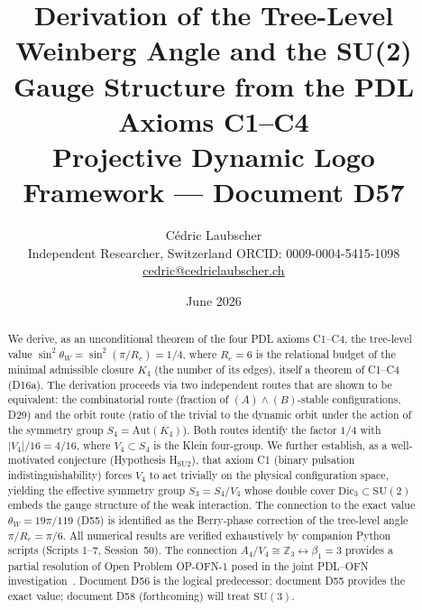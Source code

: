\documentclass[11pt,a4paper]{article}
\newcommand{\Kfour}{K_4}
\newcommand{\Retot}{R_e}
\newcommand{\sinW}{\sin^2\!\theta_W}
\newcommand{\thetaW}{\theta_W}
\begin{document}

\title{\textbf{Derivation of the Tree-Level Weinberg Angle and the SU(2) Gauge Structure from the PDL Axioms C1--C4}\\[0.5em]
\large Projective Dynamic Logo Framework --- Document D57}

\author{C\'edric Laubscher\\
\small Independent Researcher, Switzerland \quad ORCID: 0009-0004-5415-1098\\
\small \href{mailto:cedric@cedriclaubscher.ch}{cedric@cedriclaubscher.ch}}

\date{June 2026}

\maketitle

\begin{abstract}
We derive, as an unconditional theorem of the four PDL axioms C1--C4, the tree-level value $\sinW = \sin^2(\pi/\Retot) = 1/4$, where $\Retot = 6$ is the relational budget of the minimal admissible closure $\Kfour$ (the number of its edges), itself a theorem of C1--C4 (D16a). The derivation proceeds via two independent routes that are shown to be equivalent: the combinatorial route (fraction of $(A)\wedge(B)$-stable configurations, D29) and the orbit route (ratio of the trivial to the dynamic orbit under the action of the symmetry group $S_4 = \mathrm{Aut}(\Kfour)$). Both routes identify the factor $1/4$ with $|V_4|/16 = 4/16$, where $V_4 \subset S_4$ is the Klein four-group. We further establish, as a well-motivated conjecture (Hypothesis H$_{\mathrm{SU2}}$), that axiom C1 (binary pulsation indistinguishability) forces $V_4$ to act trivially on the physical configuration space, yielding the effective symmetry group $S_3 = S_4/V_4$ whose double cover $\mathrm{Dic}_3 \subset \mathrm{SU}(2)$ embeds the gauge structure of the weak interaction. The connection to the exact value $\thetaW = 19\pi/119$ (D55) is identified as the Berry-phase correction of the tree-level angle $\pi/\Retot = \pi/6$. All numerical results are verified exhaustively by companion Python scripts (Scripts 1--7, Session~50). The connection $A_4/V_4 \cong \mathbb{Z}_3 \leftrightarrow \beta_1 = 3$ provides a partial resolution of Open Problem OP-OFN-1 posed in the joint PDL--OFN investigation~\cite{PDL_N01}. Document D56 is the logical predecessor; document D55 provides the exact value; document D58 (forthcoming) will treat $\mathrm{SU}(3)$.
\end{abstract}
\end{document}
